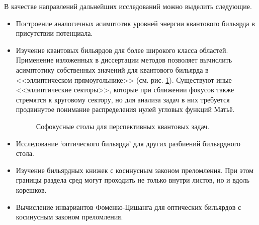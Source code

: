 %
%
%

В качестве направлений дальнейших исследований можно выделить следующие.
  \begin{itemize}[beginpenalty=10000] %
  \item Построение аналогичных асимптотик уровней энергии квантового бильярда в присутствии потенциала.
  \item Изучение квантовых бильярдов для более широкого класса областей. Применение изложенных в диссертации методов позволяет вычислить асимптотику собственных значений для квантового бильярда в <<эллиптическом прямоугольнике>> (см. рис. \ref{fig:conclusion_quantum_domains}). Существуют иные <<эллиптические секторы>>, которые при сближении фокусов также стремятся к круговому сектору, но для анализа задач в них требуется продвинутое понимание распределения нулей  угловых функций Матьё.
    \begin{figure}[ht]
    \caption{Софокусные столы для перспективных квантовых задач.}\label{fig:conclusion_quantum_domains}
\end{figure}  
  \item Исследование `оптического бильярда' для других разбиений бильярдного стола.
  \item Изучение бильярдных книжек с косинусным законом преломления. При этом границы раздела сред могут проходить не только внутри листов, но и вдоль корешков. 
  \item Вычисление инвариантов Фоменко-Цишанга для оптических бильярдов с косинусным законом преломления.
  \end{itemize}

%
